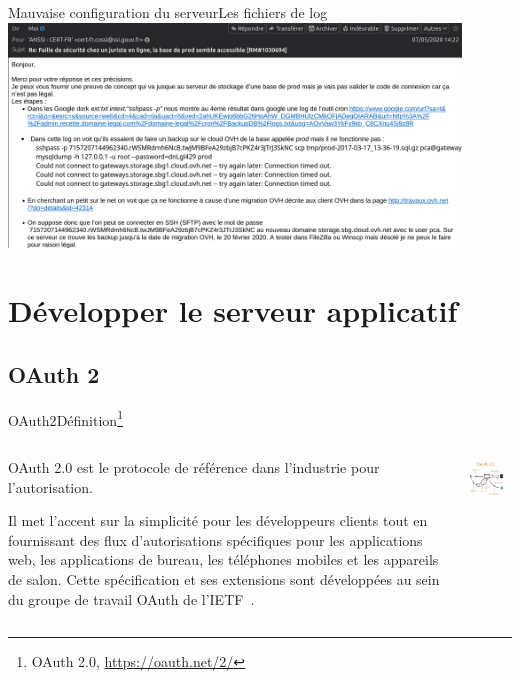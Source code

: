 \documentclass{beamer}
\begin{document}
    \begin{frame}{Mauvaise configuration du serveur}{Les fichiers de log}
        \centering
        \includegraphics[width=12cm]{image/mail-anssi}
    \end{frame}


    \section{Développer le serveur applicatif}\label{sec:dev-serveur-applicatif}

    \subsection{OAuth 2}\label{subsec:oauth-2}
    \begin{frame}{OAuth2}{Définition\footnote{OAuth 2.0, \url{https://oauth.net/2/}}}
        \begin{columns}
            \begin{column}{0.6\textwidth}
                OAuth 2.0 est le protocole de référence dans l'industrie pour l'autorisation.

                Il met l'accent sur la simplicité pour les développeurs clients tout en fournissant des flux d'autorisations spécifiques pour les applications web, les applications de bureau, les téléphones mobiles et les appareils de salon.
                Cette spécification et ses extensions sont développées au sein du groupe de travail OAuth de l'IETF~.
            \end{column}
            \begin{column}{0.4\textwidth}
                \centering
                \includegraphics[width=6cm]{image/oauth2-flow}
            \end{column}
        \end{columns}
    \end{frame}
\end{document}
